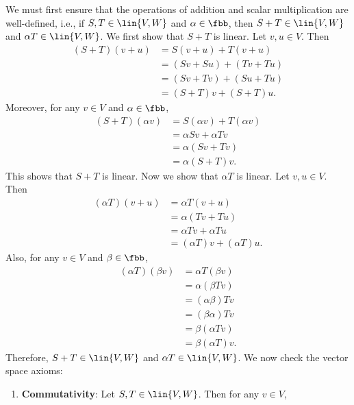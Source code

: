 \begin{sol}
    We must first ensure that the operations of addition and scalar multiplication are well-defined, i.e., if $S, T \in \lin{V, W}$ and $\alpha \in \fbb$, then $S + T \in \lin{V, W}$ and $\alpha T \in \lin{V, W}$.
	We first show that $S + T$ is linear.
	Let $v, u \in V$.
	Then
    \begin{align*}
        (S + T)(v + u) & = S(v + u) + T(v + u) \\
        & = (Sv + Su) + (Tv + Tu) \\
        & = (Sv + Tv) + (Su + Tu) \\
        & = (S + T)v + (S + T)u.
    \end{align*}
    Moreover, for any $v \in V$ and $\alpha \in \fbb$,
    \begin{align*}
        (S + T)(\alpha v) & = S(\alpha v) + T(\alpha v) \\
        & = \alpha Sv + \alpha Tv \\
        & = \alpha (Sv + Tv) \\
        & = \alpha (S + T)v.
    \end{align*}
    This shows that $S + T$ is linear.
	Now we show that $\alpha T$ is linear.
	Let $v, u \in V$.
	Then
    \begin{align*}
        (\alpha T)(v + u) & = \alpha T(v + u) \\
        & = \alpha (Tv + Tu) \\
        & = \alpha Tv + \alpha Tu \\
        & = (\alpha T)v + (\alpha T)u.
    \end{align*}
    Also, for any $v \in V$ and $\beta \in \fbb$,
    \begin{align*}
        (\alpha T)(\beta v) & = \alpha T(\beta v) \\
        & = \alpha (\beta Tv) \\
        & = (\alpha \beta) Tv \\
        & = (\beta \alpha) Tv \\
        & = \beta (\alpha Tv) \\
        & = \beta(\alpha T)v.
    \end{align*}
    Therefore, $S + T \in \lin{V, W}$ and $\alpha T \in \lin{V, W}$.
	We now check the vector space axioms:
    \begin{enumerate}
        \item \textbf{Commutativity}: Let $S, T \in \lin{V, W}$.
	Then for any $v \in V$,
        \begin{align*}

\end{align*}
\end{enumerate}
\end{sol}
